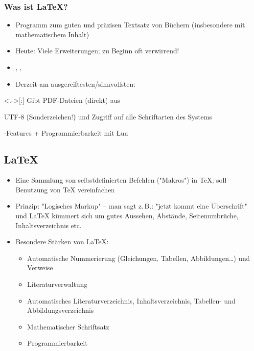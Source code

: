 \begin{frame}[<+->]
	\frametitle{Was ist \LaTeX?}

	\visible<+->{\textcolor{gray}{; aktuelle Version: 3.14159265}}
	\begin{itemize}
		\item Programm zum guten und präzisen Textsatz von Büchern (insbesondere mit mathematischem Inhalt)
		\item Heute: Viele Erweiterungen; zu Beginn oft verwirrend!
		\item %
		, , 
		\item Derzeit am ausgereiftesten/sinnvollsten: 
	\end{itemize}
	\begin{block}{}
		\begin{description}
			\item<.->[:] Gibt PDF-Dateien (direkt) aus
			\item[\hologo{XeTeX}:] UTF-8 (Sonderzeichen!) und Zugriff auf alle Schriftarten des Systems
			\item[\hologo{LuaTeX}:] -Features + Programmierbarkeit mit Lua
		\end{description}
	\end{block}
\end{frame}

\subsection{\LaTeX}

\begin{frame}[<+->]
	\begin{itemize}
		\item Eine Sammlung von selbstdefinierten Befehlen ("Makros") in \TeX; soll Benutzung von {\TeX} vereinfachen
		\item Prinzip: "Logisches Markup" – man sagt z.\,B.: "jetzt kommt eine Überschrift" und {\LaTeX} kümmert sich um gutes Aussehen, Abstände, Seitenumbrüche, Inhaltsverzeichnis etc.
		\item Besondere Stärken von \LaTeX:
		\begin{itemize}
			\item Automatische Nummerierung (Gleichungen, Tabellen, Abbildungen…) und Verweise
			\item Literaturverwaltung
			\item Automatisches Literaturverzeichnis, Inhaltsverzeichnis, Tabellen- und Abbildungsverzeichnis
			\item Mathematischer Schriftsatz
			\item Programmierbarkeit
		\end{itemize}
	\end{itemize}
\end{frame}

